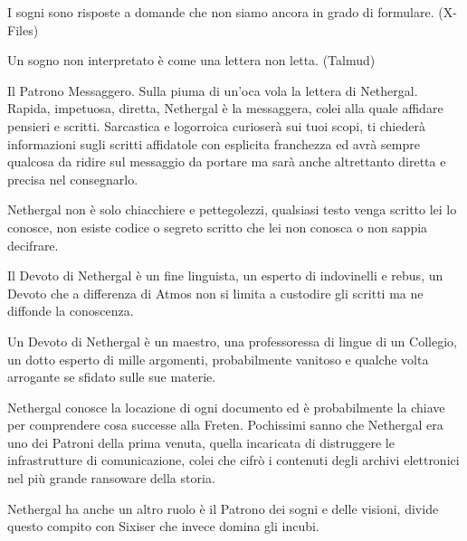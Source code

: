 \begin{multicols}{2}
\begin{enfasi}{
I sogni sono risposte a domande che non siamo ancora in grado di formulare. (X-Files)

\medskip

Un sogno non interpretato è come una lettera non letta. (Talmud)
}\end{enfasi}

\medskip

Il Patrono Messaggero. Sulla piuma di un'oca vola la lettera di Nethergal. Rapida, impetuosa, diretta, Nethergal è la messaggera, colei alla quale affidare pensieri e scritti. Sarcastica e logorroica curioserà sui tuoi scopi, ti chiederà informazioni sugli scritti affidatole con esplicita franchezza ed avrà sempre qualcosa da ridire sul messaggio da portare ma sarà anche altrettanto diretta e precisa nel consegnarlo.

Nethergal non è solo chiacchiere e pettegolezzi, qualsiasi testo venga scritto lei lo conosce, non esiste codice o segreto scritto che lei non conosca o non sappia decifrare.

Il Devoto di Nethergal è un fine linguista, un esperto di indovinelli e rebus, un Devoto che a differenza di Atmos non si limita a custodire gli scritti ma ne diffonde la conoscenza.

Un Devoto di Nethergal è un maestro, una professoressa di lingue di un Collegio, un dotto esperto di mille argomenti, probabilmente vanitoso e qualche volta arrogante se sfidato sulle sue materie.

Nethergal conosce la locazione di ogni documento ed è probabilmente la chiave per comprendere cosa successe alla Freten. Pochissimi sanno che Nethergal era uno dei Patroni della prima venuta, quella incaricata di distruggere le infrastrutture di comunicazione, colei che cifrò i contenuti degli archivi elettronici nel più grande ransoware della storia.

Nethergal ha anche un altro ruolo è il Patrono dei sogni e delle visioni, divide questo compito con Sixiser che invece domina gli incubi.


\end{multicols}
